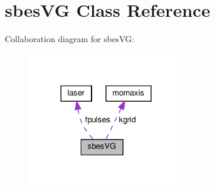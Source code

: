 \hypertarget{classsbes_v_g}{}\section{sbes\+VG Class Reference}
\label{classsbes_v_g}


Collaboration diagram for sbes\+VG\+:\nopagebreak
\begin{figure}[H]
\begin{center}
\leavevmode
\includegraphics[width=192pt]{classsbes_v_g__coll__graph}
\end{center}
\end{figure}
